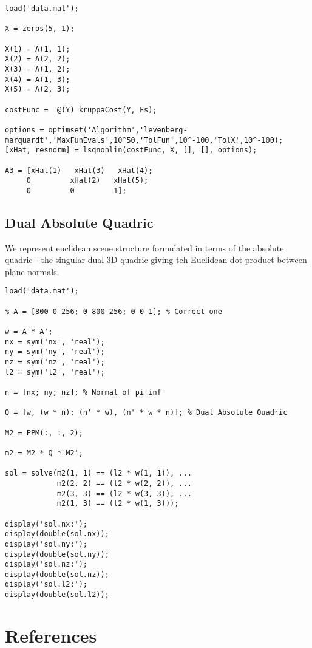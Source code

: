 \documentclass{article}
\begin{document}
\begin{lstlisting}[label=kruppa-equations-test, caption=Kruppa Equations Test]
load('data.mat');

X = zeros(5, 1);

X(1) = A(1, 1);
X(2) = A(2, 2);
X(3) = A(1, 2);
X(4) = A(1, 3);
X(5) = A(2, 3);

costFunc =  @(Y) kruppaCost(Y, Fs);

options = optimset('Algorithm','levenberg-marquardt','MaxFunEvals',10^50,'TolFun',10^-100,'TolX',10^-100);
[xHat, resnorm] = lsqnonlin(costFunc, X, [], [], options);

A3 = [xHat(1)   xHat(3)   xHat(4);
     0         xHat(2)   xHat(5);
     0         0         1];
\end{lstlisting}  

	\subsection{Dual Absolute Quadric}

	We represent euclidean scene structure formulated in terms of the absolute quadric - the singular dual 3D quadric giving teh Euclidean dot-product between plane normals.
	
	\begin{lstlisting}[label=dual-absolute-quadric, caption=Dual Absolute Quadric]
load('data.mat');

% A = [800 0 256; 0 800 256; 0 0 1]; % Correct one

w = A * A';
nx = sym('nx', 'real');
ny = sym('ny', 'real');
nz = sym('nz', 'real');
l2 = sym('l2', 'real');

n = [nx; ny; nz]; % Normal of pi inf

Q = [w, (w * n); (n' * w), (n' * w * n)]; % Dual Absolute Quadric

M2 = PPM(:, :, 2);

m2 = M2 * Q * M2';

sol = solve(m2(1, 1) == (l2 * w(1, 1)), ...
            m2(2, 2) == (l2 * w(2, 2)), ...
            m2(3, 3) == (l2 * w(3, 3)), ...
            m2(1, 3) == (l2 * w(1, 3)));

display('sol.nx:');
display(double(sol.nx));
display('sol.ny:');
display(double(sol.ny));
display('sol.nz:');
display(double(sol.nz));
display('sol.l2:');
display(double(sol.l2));
\end{lstlisting}  






\section{References}
\end{document}
